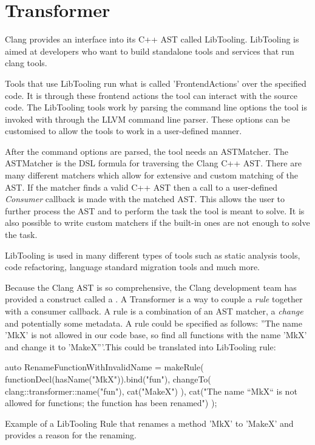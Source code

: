 \section{Transformer}

Clang provides an interface into its C++ AST called LibTooling. LibTooling is aimed at developers who want to build standalone tools and services that run clang tools.\cite{LibToolingClang17}

Tools that use LibTooling run what is called 'FrontendActions' over the specified code. It is through these frontend actions the tool can interact with the source code. The LibTooling tools work by parsing the command line options the tool is invoked with through the LLVM command line parser. These options can be customised to allow the tools to work in a user-defined manner. 

After the command options are parsed, the tool needs an ASTMatcher. The ASTMatcher is the DSL formula for traversing the Clang C++ AST. There are many different matchers which allow for extensive and custom matching of the AST.\cite{ASTMatcherReference,MatchingClangAST} If the matcher finds a valid C++ AST then a call to a user-defined \textit{Consumer} callback is made with the matched AST. This allows the user to further process the AST and to perform the task the tool is meant to solve.
It is also possible to write custom matchers if the built-in ones are not enough to solve the task.

LibTooling is used in many different types of tools such as static analysis tools, code refactoring, language standard migration tools and much more.\cite{ExternalClangExamples}

Because the Clang AST is so comprehensive, the Clang development team has provided a construct called a . A Transformer is a way to couple a \textit{rule} together with a consumer callback. A rule is a combination of an AST matcher, a \textit{change} and potentially some metadata. A rule could be specified as follows: ''The name 'MkX' is not allowed in our code base, so find all functions with the name 'MkX' and change it to 'MakeX'''.This could be translated into LibTooling rule:

\begin{listing}[H]
    \begin{cppcode}
auto RenameFunctionWithInvalidName = makeRule(
    functionDecl(hasName("MkX")).bind("fun"), 
    changeTo(
        clang::transformer::name("fun"), 
        cat("MakeX")
    ),
    cat("The name ``MkX`` is not allowed for functions; the function has been renamed")
);
    \end{cppcode}
    \caption{Example of a LibTooling Rule that renames a method 'MkX' to 'MakeX' and provides a reason for the renaming.}
    \label{code:080dev:TransformerRuleExample}
\end{listing}

